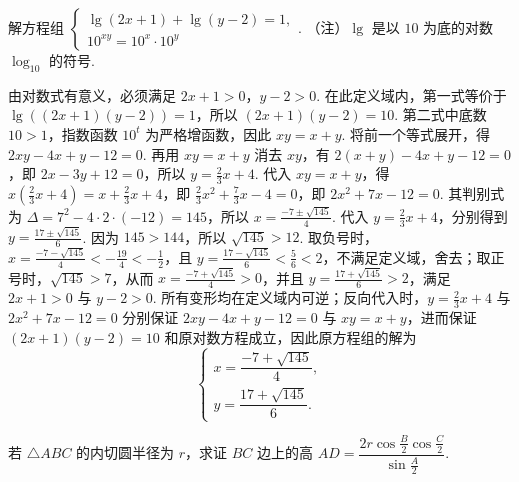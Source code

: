 \begin{problem}
解方程组 \(\begin{cases}
\lg(2x+1)+\lg(y-2)=1,\\
10^{xy}=10^{x}\cdot10^{y}
\end{cases}\). （注）\(\lg\) 是以 \(10\) 为底的对数 \(\log_{10}\) 的符号.
\end{problem}

\begin{solution}
由对数式有意义，必须满足 \(2x+1>0\)，\(y-2>0\). 在此定义域内，第一式等价于 \(\lg\left((2x+1)(y-2)\right)=1\)，所以 \((2x+1)(y-2)=10\). 第二式中底数 \(10>1\)，指数函数 \(10^t\) 为严格增函数，因此 \(xy=x+y\). 将前一个等式展开，得 \(2xy-4x+y-12=0\). 再用 \(xy=x+y\) 消去 \(xy\)，有 \(2(x+y)-4x+y-12=0\)，即 \(2x-3y+12=0\)，所以 \(y=\frac{2}{3}x+4\).
代入 \(xy=x+y\)，得 \(x\left(\frac{2}{3}x+4\right)=x+\frac{2}{3}x+4\)，即 \(\frac{2}{3}x^2+\frac{7}{3}x-4=0\)，即 \(2x^2+7x-12=0\). 其判别式为 \(\Delta=7^2-4\cdot2\cdot(-12)=145\)，所以 \(x=\frac{-7\pm\sqrt{145}}{4}\). 代入 \(y=\frac{2}{3}x+4\)，分别得到 \(y=\frac{17\pm\sqrt{145}}{6}\).
因为 \(145>144\)，所以 \(\sqrt{145}>12\). 取负号时，\(x=\frac{-7-\sqrt{145}}{4}<-\frac{19}{4}<-\frac12\)，且 \(y=\frac{17-\sqrt{145}}{6}<\frac{5}{6}<2\)，不满足定义域，舍去；取正号时，\(\sqrt{145}>7\)，从而 \(x=\frac{-7+\sqrt{145}}{4}>0\)，并且 \(y=\frac{17+\sqrt{145}}{6}>2\)，满足 \(2x+1>0\) 与 \(y-2>0\). 所有变形均在定义域内可逆；反向代入时，\(y=\frac{2}{3}x+4\) 与 \(2x^2+7x-12=0\) 分别保证 \(2xy-4x+y-12=0\) 与 \(xy=x+y\)，进而保证 \((2x+1)(y-2)=10\) 和原对数方程成立，因此原方程组的解为
\[
\begin{cases}
x=\dfrac{-7+\sqrt{145}}{4},\\
y=\dfrac{17+\sqrt{145}}{6}.
\end{cases}
\]
\end{solution}

\begin{problem}
若 \(\triangle ABC\) 的内切圆半径为 \(r\)，求证 \(BC\) 边上的高 \(AD=\dfrac{2r\cos\frac{B}{2}\cos\frac{C}{2}}{\sin\frac{A}{2}}\).
\end{problem}

